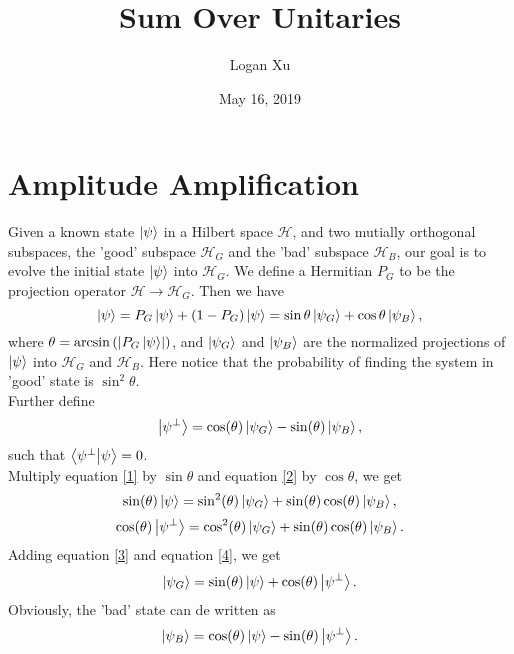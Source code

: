 \documentclass{article}
\title{Sum Over Unitaries}
\author{Logan Xu}
\date{May 16, 2019}
\begin{document}
\maketitle

\section{Amplitude Amplification}
Given a known state $\ket{\psi}$ in a Hilbert space $\mathcal{H}$, and two mutially orthogonal subspaces, the 'good' subspace $\mathcal{H}_G$ and the 'bad' subspace $\mathcal{H}_B$, our goal is to evolve the initial state $\ket{\psi}$ into $\mathcal{H}_G$. We define a Hermitian $P_G$ to be the projection operator $\mathcal{H}\rightarrow \mathcal{H}_G$. Then we have
\begin{equation}\label{1}
    \ket{\psi} = P_G\ket{\psi} + (1-P_G)\ket{\psi} = \sin{\theta}\ket{\psi_G} + \cos{\theta}\ket{\psi_B},
\end{equation}
where $\theta = \arcsin{(\abs{P_G\ket{\psi}})}$, and $\ket{\psi_G}$ and $\ket{\psi_B}$ are the normalized projections of $\ket{\psi}$ into $\mathcal{H}_G$ and $\mathcal{H}_B$. Here notice that the probability of finding the system in 'good' state is $\sin^2{\theta}$.\\
Further define
\begin{equation}\label{2}
    \ket{\psi ^\bot} = \cos({\theta}) \ket{\psi_G} - \sin({\theta}) \ket{\psi_B},
\end{equation}
such that $\braket{\psi ^\bot}{\psi} = 0$.\\
Multiply equation \ref{1} by $\sin{\theta}$ and equation \ref{2} by $\cos{\theta}$, we get
\begin{equation}\label{3}
    \sin({\theta}) \ket{\psi} = \sin^2({\theta}) \ket{\psi_G} + \sin({\theta}) \cos({\theta}) \ket{\psi_B},
\end{equation}
\begin{equation}\label{4}
    \cos({\theta}) \ket{\psi ^\bot} = \cos^2({\theta}) \ket{\psi_G} + \sin({\theta}) \cos({\theta}) \ket{\psi_B}.
\end{equation}
Adding equation \ref{3} and equation \ref{4}, we get
\begin{equation}
    \ket{\psi_G} = \sin({\theta}) \ket{\psi} + \cos({\theta}) \ket{\psi ^\bot}.
\end{equation}
Obviously, the 'bad' state can de written as
\begin{equation}
    \ket{\psi_B} = \cos({\theta}) \ket{\psi} - \sin({\theta}) \ket{\psi ^\bot}.
\end{equation}
\end{document}

